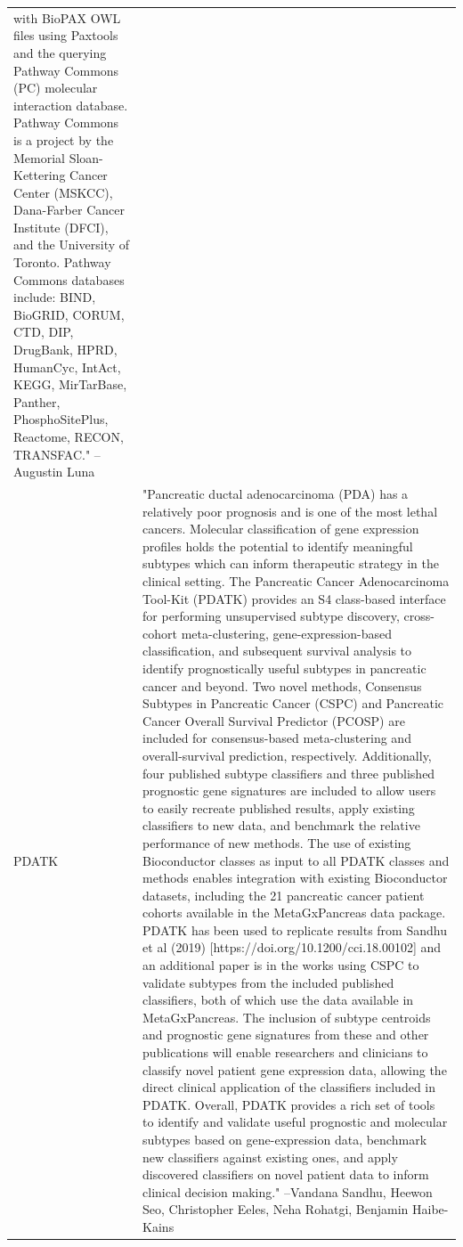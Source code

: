 \begin{longtable}[t]{l>{\raggedright\arraybackslash}p{25em}}
with BioPAX OWL files using Paxtools and the querying Pathway
Commons (PC) molecular interaction database. Pathway Commons is
a project by the Memorial Sloan-Kettering Cancer Center
(MSKCC), Dana-Farber Cancer Institute (DFCI), and the
University of Toronto. Pathway Commons databases include: BIND,
BioGRID, CORUM, CTD, DIP, DrugBank, HPRD, HumanCyc, IntAct,
KEGG, MirTarBase, Panther, PhosphoSitePlus, Reactome, RECON,
TRANSFAC." --Augustin Luna\\
PDATK & "Pancreatic ductal adenocarcinoma (PDA) has a relatively
poor prognosis and is one of the most lethal cancers. Molecular
classification of gene expression profiles holds the potential
to identify meaningful subtypes which can inform therapeutic
strategy in the clinical setting. The Pancreatic Cancer
Adenocarcinoma Tool-Kit (PDATK) provides an S4 class-based
interface for performing unsupervised subtype discovery,
cross-cohort meta-clustering, gene-expression-based
classification, and subsequent survival analysis to identify
prognostically useful subtypes in pancreatic cancer and beyond.
Two novel methods, Consensus Subtypes in Pancreatic Cancer
(CSPC) and Pancreatic Cancer Overall Survival Predictor (PCOSP)
are included for consensus-based meta-clustering and
overall-survival prediction, respectively. Additionally, four
published subtype classifiers and three published prognostic
gene signatures are included to allow users to easily recreate
published results, apply existing classifiers to new data, and
benchmark the relative performance of new methods. The use of
existing Bioconductor classes as input to all PDATK classes and
methods enables integration with existing Bioconductor
datasets, including the 21 pancreatic cancer patient cohorts
available in the MetaGxPancreas data package. PDATK has been
used to replicate results from Sandhu et al (2019)
[https://doi.org/10.1200/cci.18.00102] and an additional paper
is in the works using CSPC to validate subtypes from the
included published classifiers, both of which use the data
available in MetaGxPancreas. The inclusion of subtype centroids
and prognostic gene signatures from these and other
publications will enable researchers and clinicians to classify
novel patient gene expression data, allowing the direct
clinical application of the classifiers included in PDATK.
Overall, PDATK provides a rich set of tools to identify and
validate useful prognostic and molecular subtypes based on
gene-expression data, benchmark new classifiers against
existing ones, and apply discovered classifiers on novel
patient data to inform clinical decision making." --Vandana Sandhu, Heewon Seo, Christopher Eeles, Neha Rohatgi, Benjamin Haibe-Kains\\

\end{longtable}
